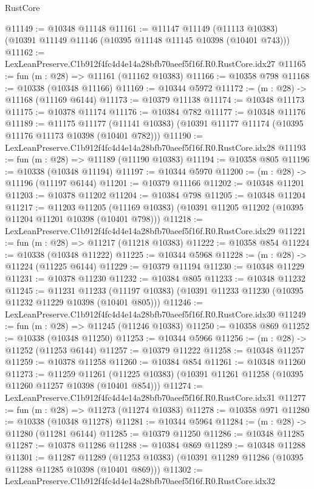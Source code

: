 \begin{lexlean}{RustCore}
\begin{coremodule}
@11149 := @10348 @11148
@11161 := @11147
    @11149
    (@11113 @10383)
    (@10391 @11149 @11146 (@10395 @11148 @11145 @10398 (@10401 @743)))
@11162 := LexLeanPreserve.C1b912f4fc4d4e14a28bfb70aeef5f16f.R0.RustCore.idx27
@11165 := fun (m : @28) => @11161 (@11162 @10383)
@11166 := @10358 @798
@11168 := @10338 (@10348 @11166)
@11169 := @10344 @5972
@11172 := (m : @28) -> @11168 (@11169 @6144)
@11173 := @10379 @11138
@11174 := @10348 @11173
@11175 := @10378 @11174
@11176 := @10384 @782
@11177 := @10348 @11176
@11189 := @11175
    @11177
    (@11141 @10383)
    (@10391 @11177 @11174 (@10395 @11176 @11173 @10398 (@10401 @782)))
@11190 := LexLeanPreserve.C1b912f4fc4d4e14a28bfb70aeef5f16f.R0.RustCore.idx28
@11193 := fun (m : @28) => @11189 (@11190 @10383)
@11194 := @10358 @805
@11196 := @10338 (@10348 @11194)
@11197 := @10344 @5970
@11200 := (m : @28) -> @11196 (@11197 @6144)
@11201 := @10379 @11166
@11202 := @10348 @11201
@11203 := @10378 @11202
@11204 := @10384 @798
@11205 := @10348 @11204
@11217 := @11203
    @11205
    (@11169 @10383)
    (@10391 @11205 @11202 (@10395 @11204 @11201 @10398 (@10401 @798)))
@11218 := LexLeanPreserve.C1b912f4fc4d4e14a28bfb70aeef5f16f.R0.RustCore.idx29
@11221 := fun (m : @28) => @11217 (@11218 @10383)
@11222 := @10358 @854
@11224 := @10338 (@10348 @11222)
@11225 := @10344 @5968
@11228 := (m : @28) -> @11224 (@11225 @6144)
@11229 := @10379 @11194
@11230 := @10348 @11229
@11231 := @10378 @11230
@11232 := @10384 @805
@11233 := @10348 @11232
@11245 := @11231
    @11233
    (@11197 @10383)
    (@10391 @11233 @11230 (@10395 @11232 @11229 @10398 (@10401 @805)))
@11246 := LexLeanPreserve.C1b912f4fc4d4e14a28bfb70aeef5f16f.R0.RustCore.idx30
@11249 := fun (m : @28) => @11245 (@11246 @10383)
@11250 := @10358 @869
@11252 := @10338 (@10348 @11250)
@11253 := @10344 @5966
@11256 := (m : @28) -> @11252 (@11253 @6144)
@11257 := @10379 @11222
@11258 := @10348 @11257
@11259 := @10378 @11258
@11260 := @10384 @854
@11261 := @10348 @11260
@11273 := @11259
    @11261
    (@11225 @10383)
    (@10391 @11261 @11258 (@10395 @11260 @11257 @10398 (@10401 @854)))
@11274 := LexLeanPreserve.C1b912f4fc4d4e14a28bfb70aeef5f16f.R0.RustCore.idx31
@11277 := fun (m : @28) => @11273 (@11274 @10383)
@11278 := @10358 @971
@11280 := @10338 (@10348 @11278)
@11281 := @10344 @5964
@11284 := (m : @28) -> @11280 (@11281 @6144)
@11285 := @10379 @11250
@11286 := @10348 @11285
@11287 := @10378 @11286
@11288 := @10384 @869
@11289 := @10348 @11288
@11301 := @11287
    @11289
    (@11253 @10383)
    (@10391 @11289 @11286 (@10395 @11288 @11285 @10398 (@10401 @869)))
@11302 := LexLeanPreserve.C1b912f4fc4d4e14a28bfb70aeef5f16f.R0.RustCore.idx32

\end{coremodule}
\end{lexlean}
